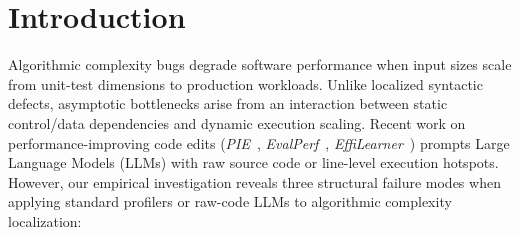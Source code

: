 \begin{abstract}
Line-hit profilers can flag the inner loop of a quadratic sliding window while missing the pointer reset that causes repeated work. They can also miss work hidden in container copies or linear library operations. We introduce Execution-Annotated Program Graphs (EAPG), which combine C++17 macro-nodes, empirical work scaling, backward program dependence slicing, and a fine-tuned language model for bottleneck localization. On a controlled benchmark of 100 constructed slow/fast pairs, work-weighted counters detect all 20 pass-by-value and linear-library bottlenecks missed by hit counters. The pruned slice retains every reference node and removes $89.0\%$ of candidates on average. In five-fold evaluation grouped by problem ID, canonical source template, and exact prompt tokens, slice-constrained Abstract EAPG with binary tags reaches $98.0\%$ Top-1. On the 66 pairs with multiple candidates, it selects 64 references, compared with 62 for the deterministic ranker.
\end{abstract}

\section{Introduction}
\label{sec:intro}

Algorithmic complexity bugs degrade software performance when input sizes scale from unit-test dimensions to production workloads. Unlike localized syntactic defects, asymptotic bottlenecks arise from an interaction between static control/data dependencies and dynamic execution scaling. Recent work on performance-improving code edits (\textit{PIE}~\cite{madaan2024pie}, \textit{EvalPerf}~\cite{liu2024evalperf}, \textit{EffiLearner}~\cite{huang2024effilearner}) prompts Large Language Models (LLMs) with raw source code or line-level execution hotspots. However, our empirical investigation reveals three structural failure modes when applying standard profilers or raw-code LLMs to algorithmic complexity localization:

